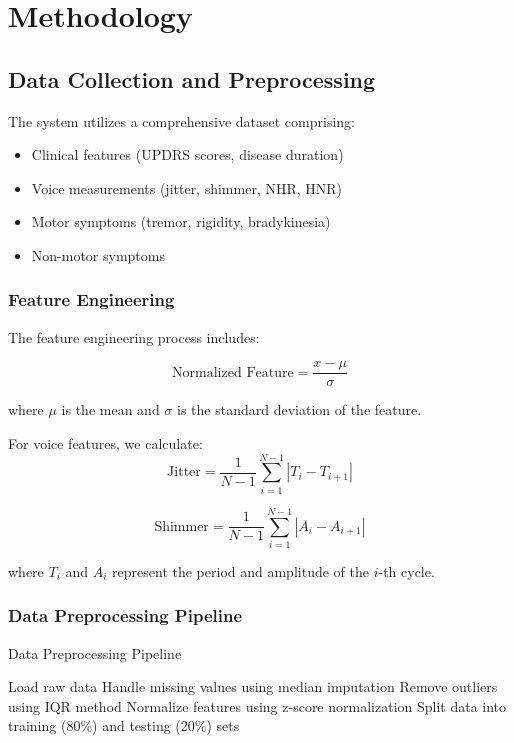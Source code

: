 \documentclass[conference]{IEEEtran}
\begin{document}
\section{Methodology}

\subsection{Data Collection and Preprocessing}
The system utilizes a comprehensive dataset comprising:
\begin{itemize}
    \item Clinical features (UPDRS scores, disease duration)
    \item Voice measurements (jitter, shimmer, NHR, HNR)
    \item Motor symptoms (tremor, rigidity, bradykinesia)
    \item Non-motor symptoms
\end{itemize}

\subsubsection{Feature Engineering}
The feature engineering process includes:

\begin{equation}
    \text{Normalized Feature} = \frac{x - \mu}{\sigma}
\end{equation}

where $\mu$ is the mean and $\sigma$ is the standard deviation of the feature.

For voice features, we calculate:
\begin{equation}
    \text{Jitter} = \frac{1}{N-1} \sum_{i=1}^{N-1} |T_i - T_{i+1}|
\end{equation}

\begin{equation}
    \text{Shimmer} = \frac{1}{N-1} \sum_{i=1}^{N-1} |A_i - A_{i+1}|
\end{equation}

where $T_i$ and $A_i$ represent the period and amplitude of the $i$-th cycle.

\subsubsection{Data Preprocessing Pipeline}
\begin{algorithm}[H]
\caption{Data Preprocessing Pipeline}
\begin{algorithmic}[1]
\State Load raw data
\State Handle missing values using median imputation
\State Remove outliers using IQR method
\State Normalize features using z-score normalization
\State Split data into training (80\%) and testing (20\%) sets
\end{algorithmic}
\end{algorithm}
\end{document}
